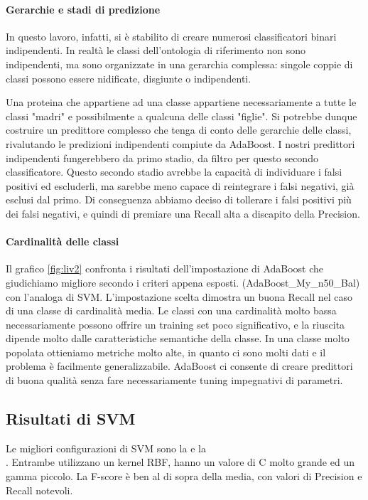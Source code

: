 \documentclass[12pt,a4paper,oneside,hidelinks]{report}
\begin{document}
\paragraph{Gerarchie e stadi di predizione}
In questo lavoro, infatti, si è stabilito di creare numerosi classificatori binari indipendenti. In realtà le classi dell'ontologia di riferimento non sono indipendenti, ma sono organizzate in una gerarchia complessa: singole coppie di classi possono essere nidificate, disgiunte o indipendenti.

Una proteina che appartiene ad una classe appartiene necessariamente a tutte le classi "madri" e possibilmente a qualcuna delle classi "figlie". Si potrebbe dunque costruire un predittore complesso che tenga di conto delle gerarchie delle classi, rivalutando le predizioni indipendenti compiute da AdaBoost. I nostri predittori indipendenti fungerebbero da primo stadio, da filtro per questo secondo classificatore.
Questo secondo stadio avrebbe la capacità di individuare i falsi positivi ed escluderli, ma sarebbe meno capace di reintegrare i falsi negativi, già esclusi dal primo. Di conseguenza abbiamo deciso di tollerare i falsi positivi più dei falsi negativi, e quindi di premiare una Recall alta a discapito della Precision.

\paragraph{Cardinalità delle classi}
Il grafico \ref{fig:liv2} confronta i risultati dell'impostazione di AdaBoost che giudichiamo migliore secondo i criteri appena esposti. (AdaBoost\_My\_n50\_Bal) con l'analoga di SVM. L'impostazione scelta dimostra un buona Recall nel caso di una classe di cardinalità media. Le classi con una cardinalità molto bassa necessariamente possono offrire un training set poco significativo, e la riuscita dipende molto dalle caratteristiche semantiche della classe. In una classe molto popolata ottieniamo metriche molto alte, in quanto ci sono molti dati e il problema è facilmente generalizzabile. AdaBoost ci consente di creare predittori di buona qualità senza fare necessariamente tuning impegnativi di parametri.

\subsection{Risultati di SVM}
Le migliori configurazioni di SVM sono la  e la \\ . Entrambe utilizzano un kernel RBF, hanno un valore di C molto grande ed un gamma piccolo. La F-score è ben al di sopra della media, con valori di Precision e Recall notevoli. 
\end{document}
